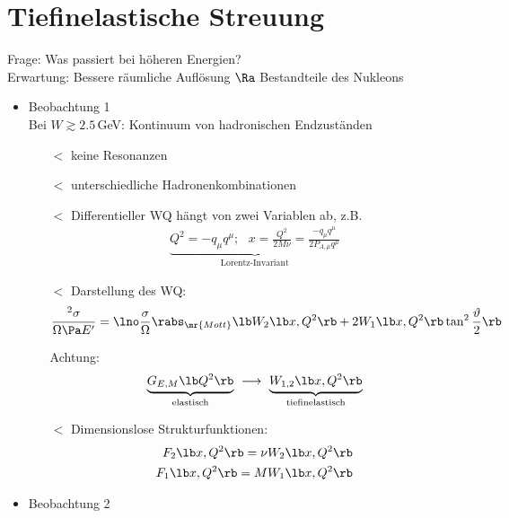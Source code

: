 \section{Tiefinelastische Streuung}
Frage: Was passiert bei höheren Energien?\\
Erwartung: Bessere räumliche Auflösung $\Ra$ Bestandteile des Nukleons
\begin{itemize}
\item Beobachtung 1\\
Bei $W \gtrsim 2.5$\,GeV: Kontinuum von hadronischen Endzuständen
\begin{itemize}
\item[$\lt$] keine Resonanzen
\item[$\lt$] unterschiedliche Hadronenkombinationen
\item[$\lt$] Differentieller WQ hängt von zwei Variablen ab, z.B.
\begin{align*}
\underbrace{Q^2 = - q_\mu q^\mu; \ \ \ x = \frac{Q^2}{2M\nu} = \frac{- q_\mu q^\mu}{2 P_{A,\mu}q^\mu}}_\text{Lorentz-Invariant}
\end{align*}
\item[$\lt$] Darstellung des WQ:
\begin{align}
\dfrac{^2 \sigma}{\Omega \Pa E^\prime} = \lno \dfrac{\sigma}{\Omega}\rabs_\mr{Mott} \lb  W_2\lb x, Q^2\rb  + 2 W_1 \lb x, Q^2\rb  \tan^2 \frac{\vartheta}{2}\rb  
\end{align}
Achtung:
\begin{align*}
\underbrace{G_{E,M}\lb Q^2\rb }_\text{elastisch} \ \longrightarrow \ \underbrace{W_{1,2} \lb  x, Q^2\rb }_\text{tiefinelastisch}
\end{align*}
\item[$\lt$] Dimensionslose Strukturfunktionen:
\begin{align}
F_2\lb x, Q^2\rb  = \nu W_2 \lb x, Q^2\rb \\
F_1 \lb x, Q^2\rb  = MW_1 \lb  x, Q^2\rb 
\end{align}
\end{itemize}
\item Beobachtung 2\\

\end{itemize}
